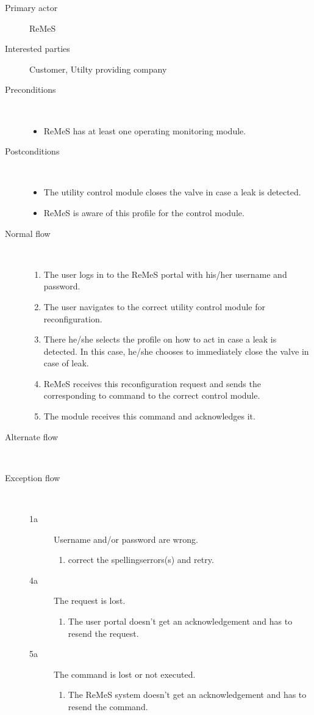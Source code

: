 \begin{description}
	\item[Primary actor] ReMeS
	\item[Interested parties] Customer, Utilty providing company
	\item[Preconditions] \ 
	\begin{itemize}
		\item ReMeS has at least one operating monitoring module.
	\end{itemize}
	\item[Postconditions] \ 
	\begin{itemize}
		\item The utility control module closes the valve in case a leak is detected.
		\item ReMeS is aware of this profile for the control module.
	\end{itemize}
	\item[Normal flow] \ 
	\begin{enumerate}
	  	\item The user logs in to the ReMeS portal with his/her username and
	  	password.
	  	\item The user navigates to the correct utility control module for
	  	reconfiguration.
	  	\item There he/she selects the profile on how to act in case a leak is
	  	detected. In this case, he/she chooses to immediately close the valve in
	  	case of leak.
	  	\item ReMeS receives this reconfiguration request and sends the
	  	corresponding to command to the correct control module.
	  	\item The module receives this command and acknowledges it.
	\end{enumerate}
	\item[Alternate flow] \ 
	\begin{description}
		\item
	\end{description}
	\item[Exception flow] \ 
	\begin{description}
		\item[1a] Username and/or password are wrong.
		\begin{enumerate}
		  \item correct the spellingserrors(s) and retry.
		\end{enumerate}
		\item[4a] The request is lost.
		\begin{enumerate}
		  \item The user portal doesn't get an acknowledgement and has to resend the
		  request.
		\end{enumerate}
		\item[5a] The command is lost or not executed.
		\begin{enumerate}
		  \item The ReMeS system doesn't get an acknowledgement and has to resend the
		  command.
		 \end{enumerate}
	\end{description}
\end{description}
